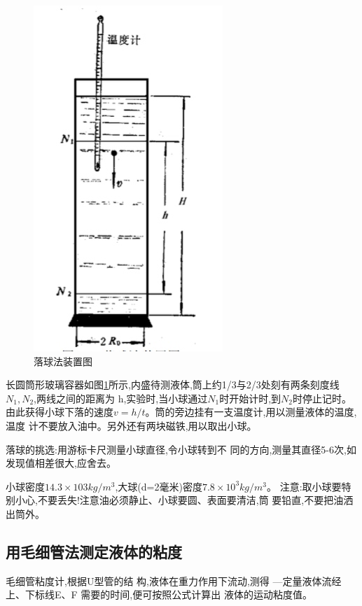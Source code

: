 \documentclass[12pt,a4paper]{ctexart}
\makeatletter
\def\maxwidth{\ifdim\Gin@nat@width>\linewidth\linewidth
\else\Gin@nat@width\fi}
\let\Oldincludegraphics\includegraphics
\renewcommand{\includegraphics}[1]{\Oldincludegraphics[width=\maxwidth]{#1}}
\makeatother
\begin{document}
\begin{figure}[htbp]
\centering
\includegraphics{media/14505376007114/14505414425530.jpg}
\caption{落球法装置图}
\label{luoqiu}
\end{figure}

长圆筒形玻璃容器如图\ref{luoqiu}所示,内盛待测液体,筒上约1/3与2/3处刻有两条刻度线
$N_1, N_2$,两线之间的距离为 h,实验时,当小球通过$N_1$时开始计时,到$N_2$时停止记时。
由此获得小球下落的速度$v=h/t$。筒的旁边挂有一支温度计,用以测量液体的温度,温度
计不要放入油中。另外还有两块磁铁,用以取出小球。

落球的挑选:用游标卡尺测量小球直径,令小球转到不
同的方向,测量其直径5-6次,如发现值相差很大,应舍去。

小球密度\(14.3×103 kg/m^3\),大球(d=2毫米)密度\(7.8×10^3kg/m^3\)。
注意:取小球要特别小心,不要丢失!注意油必须静止、小球要圆、表面要清洁,筒
要铅直,不要把油洒出筒外。

\subsection{用毛细管法测定液体的粘度}

毛细管粘度计,根据U型管的结 构,液体在重力作用下流动,测得
---定量液体流经上、下标线E、F 需要的时间,便可按照公式计算出
液体的运动粘度值。
\end{document}
